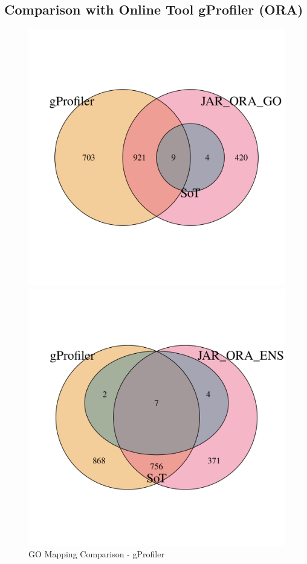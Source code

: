 \documentclass[12pt]{article}
\begin{document}
\subsection{Comparison with Online Tool gProfiler (ORA)}\label{sec:Comparison-of-ORA}
\begin{figure}[htpb]
    \centering
    \begin{minipage}{0.49\textwidth}
        \centering
        \includegraphics[width=\textwidth]{./plots/go_mappingCompgProfiler.png}
        \caption{GO Mapping Comparison - gProfiler}
        \label{fig:go-mapping-gprofiler}
    \end{minipage}
    \hfill
    \begin{minipage}{0.49\textwidth}
        \centering
        \includegraphics[width=\textwidth]{./plots/ens_mappingCompgProfiler.png}

\end{minipage}
\end{figure}
\end{document}
